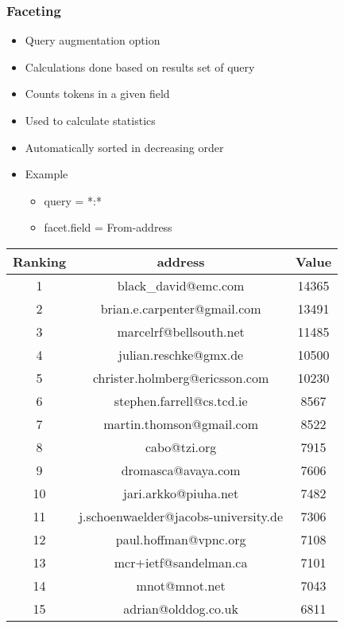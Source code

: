 \documentclass{beamer}
\begin{document}
\begin{frame}
\frametitle{Faceting}

\begin{itemize}

\item Query augmentation option\\
\item Calculations done based on results set of query 
\item Counts tokens in a given field 
\item Used to calculate statistics\\
\item Automatically sorted in decreasing order
\item Example

\begin{itemize}

\item query = *:*
\item facet.field = From-address


\end{itemize}

\end{itemize}

\end{frame}




\begin{frame}
\begin{center}
 \begin{tabular}{|c | c | c|}
 \hline
Ranking & address & Value \\ [0.5ex]
 \hline\hline
 1 & black\_david@emc.com & 14365\\
  \hline
 2 & brian.e.carpenter@gmail.com & 13491\\
  \hline
 3 & marcelrf@bellsouth.net & 11485\\
  \hline
 4 & julian.reschke@gmx.de & 10500\\
  \hline
 5 & christer.holmberg@ericsson.com & 10230\\
  \hline
 6 & stephen.farrell@cs.tcd.ie & 8567\\
  \hline
 7 & martin.thomson@gmail.com & 8522\\
  \hline
 8 & cabo@tzi.org & 7915\\
  \hline
 9 & dromasca@avaya.com & 7606\\
  \hline
 10 & jari.arkko@piuha.net & 7482\\
  \hline
 11 & j.schoenwaelder@jacobs-university.de & 7306\\
  \hline
 12 & paul.hoffman@vpnc.org & 7108\\
  \hline
 13 & mcr+ietf@sandelman.ca & 7101\\
  \hline
 14 & mnot@mnot.net & 7043\\
  \hline
 15 & adrian@olddog.co.uk & 6811\\
  \hline
\end{tabular}
\end{center}

\end{frame}
\end{document}
